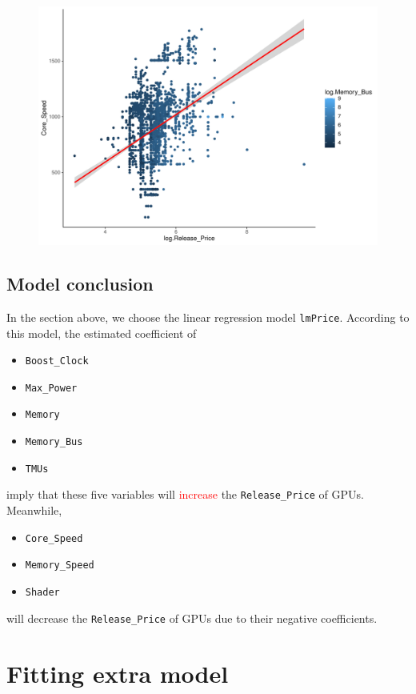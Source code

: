 \documentclass[a4paper]{article}
\begin{document}
\begin{figure}[H]
    \centering
    \includegraphics[keepaspectratio, width=1\textwidth, height=1\textheight]{LRM/Rplot9.pdf}
\end{figure}

\subsection{Model conclusion}
In the section above, we choose the linear regression model \verb|lmPrice|. According to this model, the estimated coefficient of
\begin{itemize}
    \item \verb|Boost_Clock|
    \item \verb|Max_Power|
    \item \verb|Memory|
    \item \verb|Memory_Bus|
    \item \verb|TMUs|
\end{itemize}
imply that these five variables will \textcolor{red}{increase} the \verb|Release_Price| of GPUs. Meanwhile, 
\begin{itemize}
    \item \verb|Core_Speed|
    \item \verb|Memory_Speed|
    \item \verb|Shader|
\end{itemize}
will \textcolor{mygreen}{decrease} the \verb|Release_Price| of GPUs due to their negative coefficients.

\section{Fitting extra model}
\end{document}
